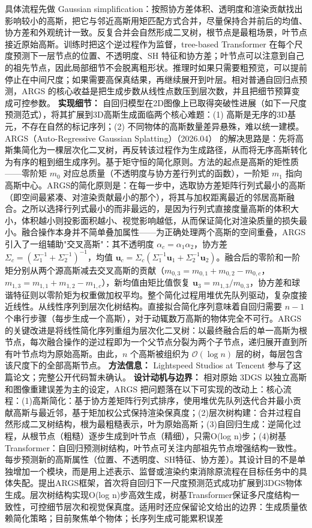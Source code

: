 具体流程先做 Gaussian simplification：按照协方差体积、透明度和渲染贡献找出影响较小的高斯，把它与邻近高斯用矩匹配方式合并，尽量保持合并前后的均值、协方差和外观统计一致。反复合并会自然形成二叉树，根节点是最粗场景，叶节点接近原始高斯。训练时把这个逆过程作为监督，tree-based Transformer 在每个尺度预测下一层节点的位置、不透明度、SH 特征和协方差；叶节点可以注意到自己的祖先节点，因此局部细节不会脱离粗形状。推理时如果只需要粗预览，可以提前停止在中间尺度；如果需要高保真结果，再继续展开到叶层。相对普通自回归点预测，ARGS 的核心收益是把生成步数从线性点数压到层次数，并且把细节预算变成可控参数。
\textbf{实现细节：} 自回归模型在2D图像上已取得突破性进展（如下一尺度预测范式），将其扩展到3D高斯生成面临两个核心难题：(1) 高斯是无序的3D基元，不存在自然的标记序列；(2) 不同物体的高斯数量差异悬殊，难以统一建模。ARGS（Auto-Regressive Gaussian Splatting）（2026.04） 的解决思路是：先将高斯集简化为一棵层次化二叉树，再反转该过程作为生成路径，从而将无序高斯转化为有序的粗到细生成序列。基于矩守恒的简化原则。方法的起点是高斯的矩性质——零阶矩 $m_0$ 对应总质量（不透明度与协方差行列式的函数），一阶矩 $m_1$ 指向高斯中心。ARGS的简化原则是：在每一步中，选取协方差矩阵行列式最小的高斯（即空间最紧凑、对渲染贡献最小的那个），将其与加权距离最近的邻居高斯融合。之所以选择行列式最小的而非最远的，是因为行列式直接度量高斯的体积大小，体积越小则投影面积越小、视觉影响越低，从而保证简化对渲染质量的损失最小。融合操作本身并不简单叠加属性——为正确处理两个高斯的空间重叠，ARGS引入了一组辅助"交叉高斯"：其不透明度 $\alpha_c = \alpha_1 \alpha_2$，协方差 $\Sigma_c = (\Sigma_1^{-1} + \Sigma_2^{-1})^{-1}$，均值 $\mathbf{u}_c = \Sigma_c(\Sigma_1^{-1}\mathbf{u}_1 + \Sigma_2^{-1}\mathbf{u}_2)$。融合后的零阶和一阶矩分别从两个源高斯减去交叉高斯的贡献（$m_{0,3} = m_{0,1} + m_{0,2} - m_{0,c}$，$m_{1,3} = m_{1,1} + m_{1,2} - m_{1,c}$），新均值由矩比值恢复 $\mathbf{u}_3 = m_{1,3}/m_{0,3}$，协方差和球谐特征则以零阶矩为权重做加权平均。整个简化过程用堆优先队列驱动，复杂度接近线性。从线性序列到层次化树结构。直接拟合简化序列意味着自回归需要 $n-1$ 个串行步骤（每步生成一个高斯），对于动辄数万高斯的物体完全不可行。ARGS的关键改进是将线性简化序列重组为层次化二叉树：以最终融合后的单一高斯为根节点，每次融合操作的逆过程即为一个父节点分裂为两个子节点，递归展开直到所有叶节点均为原始高斯。由此，$n$ 个高斯被组织为 $\mathcal{O}(\log n)$ 层的树，每层包含该尺度下的全部高斯节点。
\textbf{方法信息：} Lightspeed Studios at Tencent 参与了这篇论文；完整公开代码暂未确认。
\textbf{设计动机与边界：} 相对原始 3DGS 以独立高斯和图像重建误差为主的设定，ARGS 把问题落在以下可实现的改动上：核心流程：(1)高斯简化：基于协方差矩阵行列式排序，使用堆优先队列迭代合并最小贡献高斯与最近邻，基于矩加权公式保持渲染保真度；(2)层次树构建：合并过程自然形成二叉树结构，根为最粗糙表示，叶为原始高斯；(3)自回归生成：逆简化过程，从根节点（粗糙）逐步生成到叶节点（精细），只需O(log n)步；(4)树基Transformer：自回归预测树结构，叶节点可关注内部祖先节点增强结构一致性。每步预测新的高斯属性（位置、不透明度、SH特征、协方差）。其设计目的不是单独增加一个模块，而是用上述表示、监督或渲染约束消除原流程在目标任务中的具体失配。提出ARGS框架，首次将自回归下一尺度预测范式成功扩展到3DGS物体生成。层次树结构实现O(log n)步高效生成，树基Transformer保证多尺度结构一致性，可控细节层次和视觉保真度。适用时还应保留论文给出的边界：生成质量依赖简化策略；目前聚焦单个物体；长序列生成可能累积误差
